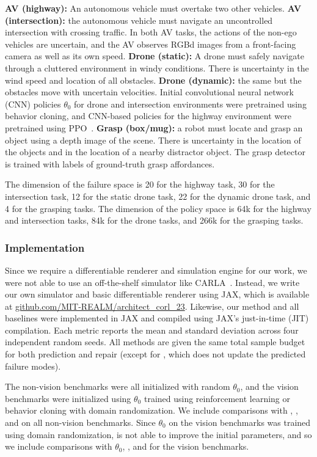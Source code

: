 {\textbf{AV (highway):} An autonomous vehicle must overtake two other vehicles.
%
\textbf{AV (intersection):} the autonomous vehicle must navigate an uncontrolled intersection with crossing traffic.
%
In both AV tasks, the actions of the non-ego vehicles are uncertain, and the AV observes RGBd images from a front-facing camera as well as its own speed.
%
\textbf{Drone (static):} A drone must safely navigate through a cluttered environment in windy conditions. There is uncertainty in the wind speed and location of all obstacles. \textbf{Drone (dynamic):} the same but the obstacles move with uncertain velocities.
%
Initial convolutional neural network (CNN) policies $\theta_0$ for drone and intersection environments were pretrained using behavior cloning, and CNN-based policies for the highway environment were pretrained using PPO~\cite{schulmanProximalPolicyOptimization2017}.
%
\textbf{Grasp (box/mug): } a robot must locate and grasp an object using a depth image of the scene. There is uncertainty in the location of the objects and in the location of a nearby distractor object. The grasp detector is trained with labels of ground-truth grasp affordances.

The dimension of the failure space is 20 for the highway task, 30 for the intersection task, 12 for the static drone task, 22 for the dynamic drone task, and 4 for the grasping tasks. The dimension of the policy space is 64k for the highway and intersection tasks, 84k for the drone tasks, and 266k for the grasping tasks.

\subsubsection{Implementation}

Since we require a differentiable renderer and simulation engine for our work, we were not able to use an off-the-shelf simulator like CARLA~\cite{Dosovitskiy17}. Instead, we write our own simulator and basic differentiable renderer using JAX, which is available at \url{github.com/MIT-REALM/architect_corl_23}.
%
Likewise, our method and all baselines were implemented in JAX and compiled using JAX's just-in-time (JIT) compilation. Each metric reports the mean and standard deviation across four independent random seeds. All methods are given the same total sample budget for both prediction and repair (except for \gdr, which does not update the predicted failure modes).

The non-vision benchmarks were all initialized with random $\theta_0$, and the vision benchmarks were initialized using $\theta_0$ trained using reinforcement learning or behavior cloning with domain randomization. We include comparisons with \gdr, \gda, and \ltc{} on all non-vision benchmarks. Since $\theta_0$ on the vision benchmarks was trained using domain randomization, \gdr{} is not able to improve the initial parameters, and so we include comparisons with $\theta_0$, \gda, and \ltc{} for the vision benchmarks.

}
